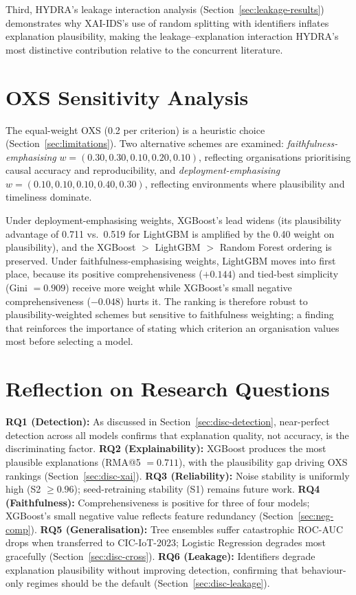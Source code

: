 \documentclass[12pt,a4paper]{report}
\begin{document}
Third, HYDRA's leakage interaction analysis (Section~\ref{sec:leakage-results}) demonstrates why XAI-IDS's \cite{arreche2024b} use of random splitting with identifiers inflates explanation plausibility, making the leakage--explanation interaction HYDRA's most distinctive contribution relative to the concurrent literature.

\section{OXS Sensitivity Analysis}
\label{sec:oxs-sensitivity}

The equal-weight OXS (0.2 per criterion) is a heuristic choice (Section~\ref{sec:limitations}). Two alternative schemes are examined: \textit{faithfulness-emphasising} $w = (0.30, 0.30, 0.10, 0.20, 0.10)$, reflecting organisations prioritising causal accuracy and reproducibility, and \textit{deployment-emphasising} $w = (0.10, 0.10, 0.10, 0.40, 0.30)$, reflecting environments where plausibility and timeliness dominate.

Under deployment-emphasising weights, XGBoost's lead widens (its plausibility advantage of 0.711 vs.\ 0.519 for LightGBM is amplified by the 0.40 weight on plausibility), and the XGBoost $>$ LightGBM $>$ Random Forest ordering is preserved. Under faithfulness-emphasising weights, LightGBM moves into first place, because its positive comprehensiveness ($+0.144$) and tied-best simplicity (Gini $= 0.909$) receive more weight while XGBoost's small negative comprehensiveness ($-0.048$) hurts it. The ranking is therefore robust to plausibility-weighted schemes but sensitive to faithfulness weighting; a finding that reinforces the importance of stating which criterion an organisation values most before selecting a model.

\section{Reflection on Research Questions}
\label{sec:rq-reflection}

\textbf{RQ1 (Detection):} As discussed in Section~\ref{sec:disc-detection}, near-perfect detection across all models confirms that explanation quality, not accuracy, is the discriminating factor. \textbf{RQ2 (Explainability):} XGBoost produces the most plausible explanations (RMA@5 $= 0.711$), with the plausibility gap driving OXS rankings (Section~\ref{sec:disc-xai}). \textbf{RQ3 (Reliability):} Noise stability is uniformly high (S2 $\geq 0.96$); seed-retraining stability (S1) remains future work. \textbf{RQ4 (Faithfulness):} Comprehensiveness is positive for three of four models; XGBoost's small negative value reflects feature redundancy (Section~\ref{sec:neg-comp}). \textbf{RQ5 (Generalisation):} Tree ensembles suffer catastrophic ROC-AUC drops when transferred to CIC-IoT-2023; Logistic Regression degrades most gracefully (Section~\ref{sec:disc-cross}). \textbf{RQ6 (Leakage):} Identifiers degrade explanation plausibility without improving detection, confirming that behaviour-only regimes should be the default (Section~\ref{sec:disc-leakage}).
\end{document}
